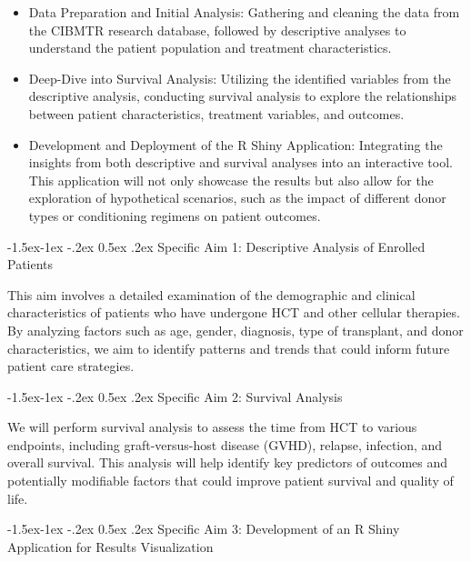 \documentclass[11pt,]{article}
\makeatletter
\renewcommand\subsection{
  \@startsection{subsection}{2}{\z@}
    {-1.5ex\@plus -1ex \@minus -.2ex}%
    {0.5ex \@plus .2ex}%
    {\normalfont\normalsize\bf}} %
\makeatother
\begin{document}
\begin{itemize}
\item
  Data Preparation and Initial Analysis: Gathering and cleaning the data
  from the CIBMTR research database, followed by descriptive analyses to
  understand the patient population and treatment characteristics.
\item
  Deep-Dive into Survival Analysis: Utilizing the identified variables
  from the descriptive analysis, conducting survival analysis to explore
  the relationships between patient characteristics, treatment
  variables, and outcomes.
\item
  Development and Deployment of the R Shiny Application: Integrating the
  insights from both descriptive and survival analyses into an
  interactive tool. This application will not only showcase the results
  but also allow for the exploration of hypothetical scenarios, such as
  the impact of different donor types or conditioning regimens on
  patient outcomes.
\end{itemize}

\hypertarget{specific-aim-1-descriptive-analysis-of-enrolled-patients}{%
\subsection{Specific Aim 1: Descriptive Analysis of Enrolled
Patients}\label{specific-aim-1-descriptive-analysis-of-enrolled-patients}}

This aim involves a detailed examination of the demographic and clinical
characteristics of patients who have undergone HCT and other cellular
therapies. By analyzing factors such as age, gender, diagnosis, type of
transplant, and donor characteristics, we aim to identify patterns and
trends that could inform future patient care strategies.

\hypertarget{specific-aim-2-survival-analysis}{%
\subsection{Specific Aim 2: Survival
Analysis}\label{specific-aim-2-survival-analysis}}

We will perform survival analysis to assess the time from HCT to various
endpoints, including graft-versus-host disease (GVHD), relapse,
infection, and overall survival. This analysis will help identify key
predictors of outcomes and potentially modifiable factors that could
improve patient survival and quality of life.

\hypertarget{specific-aim-3-development-of-an-r-shiny-application-for-results-visualization}{%
\subsection{Specific Aim 3: Development of an R Shiny Application for
Results
Visualization}\label{specific-aim-3-development-of-an-r-shiny-application-for-results-visualization}}
\end{document}
